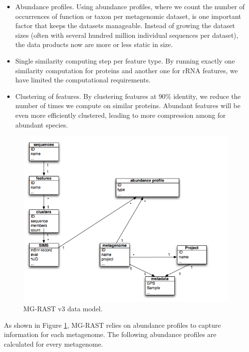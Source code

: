 \documentclass[12pt,fullpage]{report}
\begin{document}
\begin{itemize}
\item Abundance profiles.
Using abundance profiles, where we count the number of occurrences of function or taxon per metagenomic dataset, is one important factor that keeps the datasets manageable. Instead of growing the dataset sizes (often with several hundred million individual sequences per dataset), the data products now are more or less static in size.

\item Single similarity computing step per feature type.
By running exactly one similarity computation for proteins and another one for \gls{rRNA} features, we have limited the computational requirements.

\item Clustering of features.
By clustering features at 90\% identity, we reduce the number of times we compute on similar proteins. Abundant features will be even more efficiently clustered, leading to more compression among for abundant species.

\end{itemize}

\begin{figure}
\begin{center}
\includegraphics[width=6in]{Images/data-model.png}
\end{center}
\caption{
MG-RAST v3 data model.}
\label{fig:data-model}
\end{figure}

As shown in Figure \ref{fig:data-model}, MG-RAST relies on abundance profiles to capture information for each metagenome.
The following abundance profiles are calculated for every metagenome.
\end{document}
